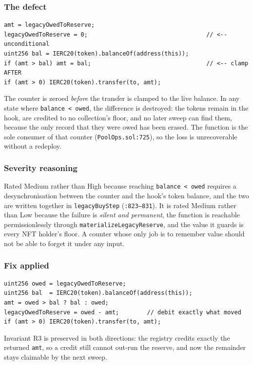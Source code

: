 \documentclass[11pt,a4paper]{article}
\newcommand{\code}[1]{\texttt{\small #1}}
\newcommand{\fileref}[1]{\texttt{\scriptsize #1}}
\begin{document}
\subsubsection*{The defect}

\begin{lstlisting}
amt = legacyOwedToReserve;
legacyOwedToReserve = 0;                                  // <-- unconditional
uint256 bal = IERC20(token).balanceOf(address(this));
if (amt > bal) amt = bal;                                 // <-- clamp AFTER
if (amt > 0) IERC20(token).transfer(to, amt);
\end{lstlisting}

The counter is zeroed \emph{before} the transfer is clamped to the live balance.
In any state where \code{balance < owed}, the difference is destroyed: the tokens
remain in the hook, are credited to no collection's floor, and no later sweep can
find them, because the only record that they were owed has been erased. The
function is the sole consumer of that counter
(\fileref{PoolOps.sol:725}), so the loss is unrecoverable without a redeploy.

\subsubsection*{Severity reasoning}

Rated Medium rather than High because reaching \code{balance < owed} requires a
desynchronisation between the counter and the hook's token balance, and the two
are written together in \code{legacyBuyStep} (\fileref{:823--831}). It is rated
Medium rather than Low because the failure is \emph{silent and permanent}, the
function is reachable permissionlessly through
\code{materializeLegacyReserve}, and the value it guards is every NFT holder's
floor. A counter whose only job is to remember value should not be able to forget
it under any input.

\subsubsection*{Fix applied}

\begin{lstlisting}
uint256 owed = legacyOwedToReserve;
uint256 bal  = IERC20(token).balanceOf(address(this));
amt = owed > bal ? bal : owed;
legacyOwedToReserve = owed - amt;        // debit exactly what moved
if (amt > 0) IERC20(token).transfer(to, amt);
\end{lstlisting}
Invariant R3 is preserved in both directions: the registry credits exactly the
returned \code{amt}, so a credit still cannot out-run the reserve, and now the
remainder stays claimable by the next sweep.
\end{document}
